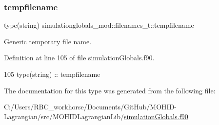 \subsubsection{\texorpdfstring{tempfilename}{tempfilename}}
{\footnotesize\ttfamily type(string) simulationglobals\+\_\+mod\+::filenames\+\_\+t\+::tempfilename\hspace{0.3cm}{\ttfamily [private]}}



Generic temporary file name. 



Definition at line 105 of file simulation\+Globals.\+f90.


\begin{DoxyCode}
105         \textcolor{keywordtype}{type}(string) :: tempfilename
\end{DoxyCode}


The documentation for this type was generated from the following file\+:\begin{DoxyCompactItemize}
\item 
C\+:/\+Users/\+R\+B\+C\+\_\+workhorse/\+Documents/\+Git\+Hub/\+M\+O\+H\+I\+D-\/\+Lagrangian/src/\+M\+O\+H\+I\+D\+Lagrangian\+Lib/\mbox{\hyperlink{simulation_globals_8f90}{simulation\+Globals.\+f90}}\end{DoxyCompactItemize}
